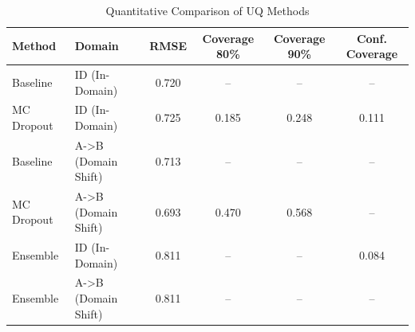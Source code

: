 
\begin{table}[h]
\centering
\caption{Quantitative Comparison of UQ Methods}
\label{tab:uq_comparison}
\begin{tabular}{llcccc}
\toprule
Method & Domain & RMSE & Coverage 80\% & Coverage 90\% & Conf. Coverage \\
\midrule
Baseline & ID (In-Domain) & 0.720 & -- & -- & -- \\
MC Dropout & ID (In-Domain) & 0.725 & 0.185 & 0.248 & 0.111 \\
Baseline & A->B (Domain Shift) & 0.713 & -- & -- & -- \\
MC Dropout & A->B (Domain Shift) & 0.693 & 0.470 & 0.568 & -- \\
Ensemble & ID (In-Domain) & 0.811 & -- & -- & 0.084 \\
Ensemble & A->B (Domain Shift) & 0.811 & -- & -- & -- \\
\bottomrule
\end{tabular}
\end{table}
